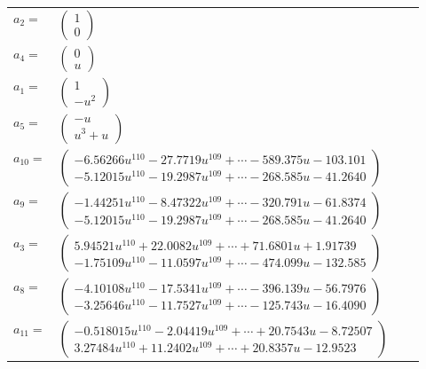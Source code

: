 \documentclass[1p]{elsarticle_modified}
\theoremstyle{definition}
\begin{document}
\begin{tabular}{m{7pt} m{180pt} m{7pt} m{180pt} }
\flushright $a_{2}=$&$\begin{pmatrix}1\\0\end{pmatrix}$ \\
\flushright $a_{4}=$&$\begin{pmatrix}0\\u\end{pmatrix}$ \\
\flushright $a_{1}=$&$\begin{pmatrix}1\\- u^2\end{pmatrix}$ \\
\flushright $a_{5}=$&$\begin{pmatrix}- u\\u^3+u\end{pmatrix}$ \\
\flushright $a_{10}=$&$\begin{pmatrix}-6.56266 u^{110}-27.7719 u^{109}+\cdots-589.375 u-103.101\\-5.12015 u^{110}-19.2987 u^{109}+\cdots-268.585 u-41.2640\end{pmatrix}$ \\
\flushright $a_{9}=$&$\begin{pmatrix}-1.44251 u^{110}-8.47322 u^{109}+\cdots-320.791 u-61.8374\\-5.12015 u^{110}-19.2987 u^{109}+\cdots-268.585 u-41.2640\end{pmatrix}$ \\
\flushright $a_{3}=$&$\begin{pmatrix}5.94521 u^{110}+22.0082 u^{109}+\cdots+71.6801 u+1.91739\\-1.75109 u^{110}-11.0597 u^{109}+\cdots-474.099 u-132.585\end{pmatrix}$ \\
\flushright $a_{8}=$&$\begin{pmatrix}-4.10108 u^{110}-17.5341 u^{109}+\cdots-396.139 u-56.7976\\-3.25646 u^{110}-11.7527 u^{109}+\cdots-125.743 u-16.4090\end{pmatrix}$ \\
\flushright $a_{11}=$&$\begin{pmatrix}-0.518015 u^{110}-2.04419 u^{109}+\cdots+20.7543 u-8.72507\\3.27484 u^{110}+11.2402 u^{109}+\cdots+20.8357 u-12.9523\end{pmatrix}$ \\

\end{tabular}
\end{document}
